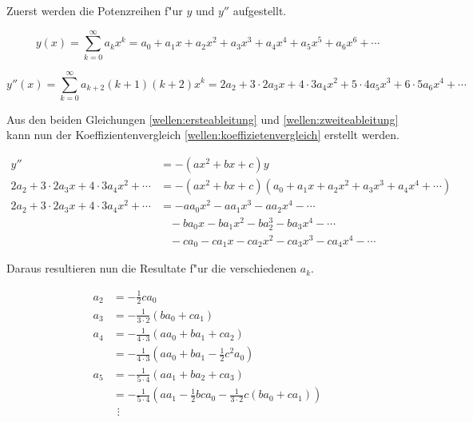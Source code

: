 \begin{refsection}
Zuerst werden die Potenzreihen f"ur $y$ und $y''$ aufgestellt.

\begin{equation}
	y(x)
	=
	\sum_{k = 0}^{\infty} a_{k}x^k
	=
	a_0 + a_1x + a_2x^2 + a_3x^3 + a_4x^4 + a_5x^5 + a_6x^6 + \dotsb
	\label{wellen:ersteableitung}
\end{equation}

\begin{equation}
	y''(x)
	=
	\sum_{k = 0}^{\infty} a_{k+2}(k+1)(k+2)x^k
	=
	2a_2 + 3 \mathbin{\cdot} 2a_3x + 4 \mathbin{\cdot} 3a_4x^2 + 5 
	\mathbin{\cdot} 4a_5x^3 + 6 \mathbin{\cdot} 5a_6x^4 + \dotsb
	\label{wellen:zweiteableitung}
\end{equation}

Aus den beiden Gleichungen \ref{wellen:ersteableitung} und 
\ref{wellen:zweiteableitung} kann nun der Koeffizientenvergleich 
\ref{wellen:koeffizietenvergleich} erstellt werden.

\begin{equation}
	\begin{split}
		y''
		&=
		-(ax^2+bx+c)y \\
		2a_2 + 3 \mathbin{\cdot} 2a_3x + 4 \mathbin{\cdot} 3a_4x^2 + \dotsb
		&=
		-(ax^2+bx+c)(a_0 + a_1x + a_2x^2 + a_3x^3 + a_4x^4 + \dotsb) \\
		2a_2 + 3 \mathbin{\cdot} 2a_3x + 4 \mathbin{\cdot} 3a_4x^2 + \dotsb
		&=
		-aa_0x^2-aa_1x^3-aa_2x^4-\dotsb \\
		&\hspace{10pt}
		-ba_0x-ba_1x^2-ba_2^3-ba_3x^4-\dotsb \\
		&\hspace{10pt}
		-ca_0-ca_1x-ca_2x^2-ca_3x^3-ca_4x^4 - \dotsb
	\end{split}
	\label{wellen:koeffizietenvergleich}
\end{equation}

Daraus resultieren nun die Resultate f"ur die verschiedenen $a_k$.

\begin{equation}
	\begin{split}
		a_2
		&=
		-\frac{1}{2}ca_0 \\
		a_3
		&=
		-\frac{1}{3 \cdot 2} (ba_0 + ca_1) \\
		a_4
		&=
		-\frac{1}{4 \cdot 3} (aa_0 + ba_1 + ca_2) \\
		&=
		-\frac{1}{4 \cdot 3} (aa_0 + ba_1 -\frac{1}{2}c^2a_0) \\
		a_5
		&=
		-\frac{1}{5 \cdot 4} (aa_1 + ba_2 + ca_3) \\
		&=
		-\frac{1}{5 \cdot 4} (aa_1 -\frac{1}{2}bca_0 -\frac{1}{3 \cdot 2} 
		c(ba_0 + ca_1)) \\
		&\hspace{5pt}\vdots
	\end{split}
	\label{wellen:aks}
\end{equation}


\end{refsection}
